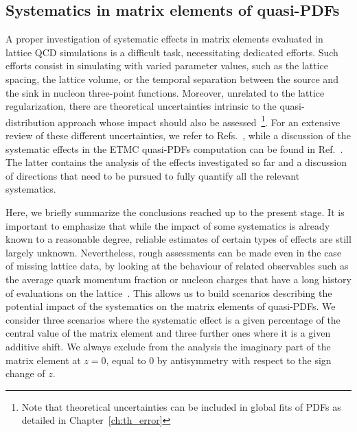 \subsection{Systematics in matrix elements of quasi-PDFs}
\label{subsec:sys}

A proper investigation of systematic effects in matrix elements evaluated in
lattice QCD simulations is a difficult task, necessitating dedicated efforts.
Such efforts consist in simulating with varied parameter values, such as the
lattice spacing, the lattice volume, or the temporal separation between the
source and the sink in nucleon three-point functions. Moreover, unrelated to the
lattice regularization, there are theoretical uncertainties intrinsic to the
quasi-distribution approach whose impact should also be assessed~\footnote{Note
that theoretical uncertainties can be included in global fits of PDFs as
detailed in Chapter~\ref{ch:th_error}}. For an extensive review of these
different uncertainties, we refer to Refs.~\cite{Cichy:2018mum,Monahan:2018euv},
while a discussion of the systematic effects in the ETMC quasi-PDFs computation
can be found in Ref.~\cite{Alexandrou:2019lfo}. The latter contains the analysis
of the effects investigated so far and a discussion of directions that need to
be pursued to fully quantify all the relevant systematics.

Here, we briefly summarize the conclusions reached up to the present stage. It
is important to emphasize that while the impact of some systematics is already
known to a reasonable degree, reliable estimates of certain types of effects are
still largely unknown. Nevertheless, rough assessments can be made even in the
case of missing lattice data, by looking at the behaviour of related observables
such as the average quark momentum fraction or nucleon charges that have a long
history of evaluations on the
lattice~\cite{Syritsyn:2014saa,Constantinou:2014tga,Constantinou:2015agp,Alexandrou:2015xts,Green:2018vxw}.
This allows us to build scenarios describing the potential impact of the
systematics on the matrix elements of quasi-PDFs. We consider three scenarios
where the systematic effect is a given percentage of the central value of the
matrix element and three further ones where it is a given additive shift. We
always exclude from the analysis the imaginary part of the matrix element at
$z=0$, equal to 0 by antisymmetry with respect to the sign change of $z$.


